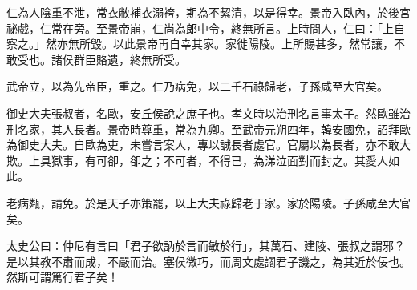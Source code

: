 \begin{pinyinscope}
仁為人陰重不泄，常衣敝補衣溺袴，期為不絜清，以是得幸。景帝入臥內，於後宮祕戲，仁常在旁。至景帝崩，仁尚為郎中令，終無所言。上時問人，仁曰：「上自察之。」然亦無所毀。以此景帝再自幸其家。家徙陽陵。上所賜甚多，然常讓，不敢受也。諸侯群臣賂遺，終無所受。

武帝立，以為先帝臣，重之。仁乃病免，以二千石祿歸老，子孫咸至大官矣。

御史大夫張叔者，名歐，安丘侯說之庶子也。孝文時以治刑名言事太子。然歐雖治刑名家，其人長者。景帝時尊重，常為九卿。至武帝元朔四年，韓安國免，詔拜歐為御史大夫。自歐為吏，未嘗言案人，專以誠長者處官。官屬以為長者，亦不敢大欺。上具獄事，有可卻，卻之；不可者，不得已，為涕泣面對而封之。其愛人如此。

老病甐，請免。於是天子亦策罷，以上大夫祿歸老于家。家於陽陵。子孫咸至大官矣。

太史公曰：仲尼有言曰「君子欲訥於言而敏於行」，其萬石、建陵、張叔之謂邪？是以其教不肅而成，不嚴而治。塞侯微巧，而周文處讇君子譏之，為其近於佞也。然斯可謂篤行君子矣！


\end{pinyinscope}